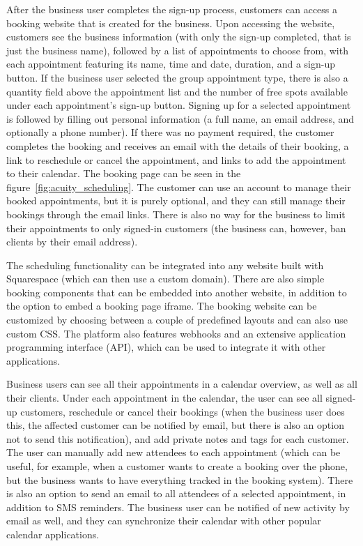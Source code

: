 After the business user completes the sign-up process, customers can access a booking website that is created for the business. Upon accessing the website, customers see the business information (with only the sign-up completed, that is just the business name), followed by a list of appointments to choose from, with each appointment featuring its name, time and date, duration, and a sign-up button. If the business user selected the group appointment type, there is also a quantity field above the appointment list and the number of free spots available under each appointment's sign-up button. Signing up for a selected appointment is followed by filling out personal information (a full name, an email address, and optionally a phone number). If there was no payment required, the customer completes the booking and receives an email with the details of their booking, a link to reschedule or cancel the appointment, and links to add the appointment to their calendar. The booking page can be seen in the figure~\ref{fig:acuity_scheduling}. The customer can use an account to manage their booked appointments, but it is purely optional, and they can still manage their bookings through the email links. There is also no way for the business to limit their appointments to only signed-in customers (the business can, however, ban clients by their email address).

The scheduling functionality can be integrated into any website built with Squarespace (which can then use a custom domain). There are also simple booking components that can be embedded into another website, in addition to the option to embed a booking page iframe. The booking website can be customized by choosing between a couple of predefined layouts and can also use custom CSS. The platform also features webhooks and an extensive application programming interface (API), which can be used to integrate it with other applications.

Business users can see all their appointments in a calendar overview, as well as all their clients. Under each appointment in the calendar, the user can see all signed-up customers, reschedule or cancel their bookings (when the business user does this, the affected customer can be notified by email, but there is also an option not to send this notification), and add private notes and tags for each customer. The user can manually add new attendees to each appointment (which can be useful, for example, when a customer wants to create a booking over the phone, but the business wants to have everything tracked in the booking system). There is also an option to send an email to all attendees of a selected appointment, in addition to SMS reminders. The business user can be notified of new activity by email as well, and they can synchronize their calendar with other popular calendar applications.

